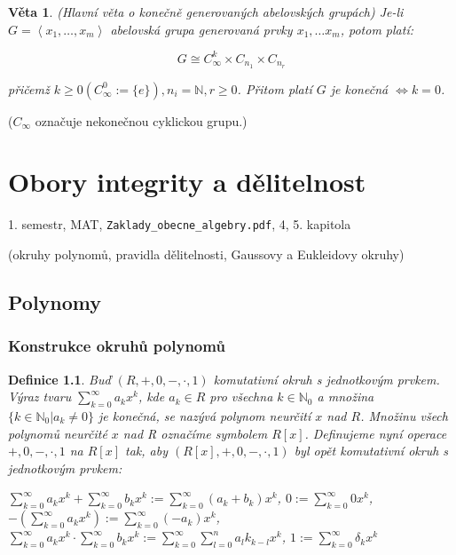 \documentclass[a4paper, 11pt]{report}
\newtheorem{mydef}{Definice}[chapter]
\newtheorem{veta}{Věta}[chapter]
\begin{document}
\begin{veta}
(Hlavní věta o konečně generovaných abelovských grupách) Je-li $G = \left< x_1, \dots, x_m \right>$ abelovská grupa generovaná prvky $x_1, \dots x_m$, potom platí:

$$ G \cong C_\infty^k \times C_{n_1} \times C_{n_r} $$

přičemž $k \geq 0 (C_\infty^0 := \{e\}), n_i = \mathbb{N}, r \geq 0$. Přitom platí $G$ je konečná $\Leftrightarrow k = 0$.
\end{veta}
($C_\infty$ označuje nekonečnou cyklickou grupu.)

















\chapter{Obory integrity a dělitelnost} \label{cha:10}

1. semestr, MAT, \texttt{Zaklady\_obecne\_algebry.pdf}, 4, 5. kapitola

(okruhy polynomů, pravidla dělitelnosti, Gaussovy a Eukleidovy okruhy)

\section{Polynomy}
\subsection{Konstrukce okruhů polynomů}

\begin{mydef}
Buď $(R, +, 0, -, \cdot, 1)$ komutativní okruh s jednotkovým prvkem. Výraz tvaru $\sum_{k=0}^\infty a_kx^k$, kde $a_k \in R$ pro všechna $k \in \mathbb{N}_0$ a množina $\{k \in \mathbb{N}_0 | a_k \not= 0\}$ je konečná, se nazývá polynom neurčití $x$ nad $R$. Množinu všech polynomů neurčité $x$ nad R označíme symbolem $R[x]$. Definujeme nyní operace $+, 0, -, \cdot, 1$ na $R[x]$ tak, aby $(R[x], +, 0, -, \cdot, 1)$ byl opět komutativní okruh s jednotkovým prvkem:

$ \sum_{k = 0}^\infty a_k x^k + \sum_{k = 0}^\infty b_k x^k  := \sum_{k = 0}^\infty (a_k + b_k) x^k$,
$0 := \sum_{k = 0}^\infty 0 x^k $,
$-(\sum_{k = 0}^\infty a_k x^k) := \sum_{k = 0}^\infty (-a_k) x^k$,
$\sum_{k = 0}^\infty a_k x^k \cdot \sum_{k = 0}^\infty b_k x^k := \sum_{k = 0}^\infty \sum_{l = 0}^n a_l k_{k-l} x^k$,
$1 := \sum_{k = 0}^\infty \delta_k x^k$
\end{mydef}
\end{document}

